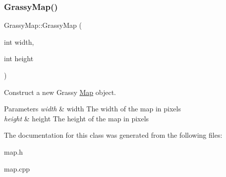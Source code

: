 \subsubsection{\texorpdfstring{GrassyMap()}{GrassyMap()}}
{\footnotesize\ttfamily Grassy\+Map\+::\+Grassy\+Map (\begin{DoxyParamCaption}\item[{int}]{width,  }\item[{int}]{height }\end{DoxyParamCaption})}



Construct a new Grassy \mbox{\hyperlink{classMap}{Map}} object. 


\begin{DoxyParams}{Parameters}
{\em width} & width The width of the map in pixels \\
\hline
{\em height} & height The height of the map in pixels \\
\hline
\end{DoxyParams}


The documentation for this class was generated from the following files\+:\begin{DoxyCompactItemize}
\item 
map.\+h\item 
map.\+cpp\end{DoxyCompactItemize}

